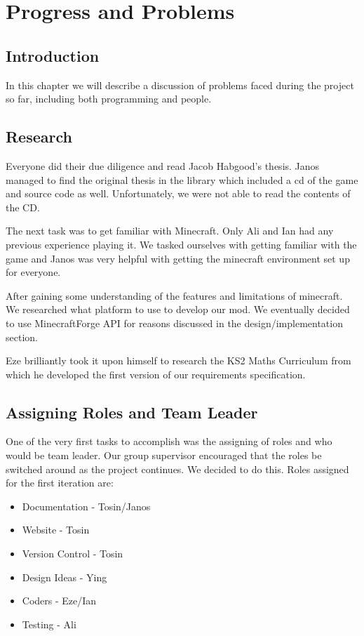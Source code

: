\chapter{Progress and Problems}

\section{Introduction}
In this chapter we will describe a discussion of problems faced 
during the project so far, including both programming and people.

\section{Research}
Everyone did their due diligence and read Jacob Habgood’s thesis. 
Janos managed to find the original thesis in the library which 
included a cd of the game and source code as well. Unfortunately, 
we were not able to read the contents of the CD.

The next task was to get familiar with Minecraft. Only Ali and 
Ian had any previous experience playing it. We tasked ourselves 
with getting familiar with the game and Janos was very helpful 
with getting the minecraft environment set up for everyone. 

After gaining some understanding of  the features and limitations 
of minecraft. We researched what platform to use to develop our 
mod. We eventually decided to use MinecraftForge API for reasons 
discussed in the design/implementation section.

Eze brilliantly took it upon himself to research the KS2 Maths 
Curriculum from which he developed the first version of our 
requirements specification.

\section{Assigning Roles and Team Leader}
One of the very first tasks to accomplish was the assigning of 
roles and who would be team leader. Our group supervisor encouraged 
that the roles be switched around as the project continues. We 
decided to do this. Roles assigned for the first iteration are:

\begin{itemize}
\item Documentation - Tosin/Janos
\item Website - Tosin
\item Version Control - Tosin
\item Design Ideas - Ying
\item Coders - Eze/Ian
\item Testing - Ali
\end{itemize}

